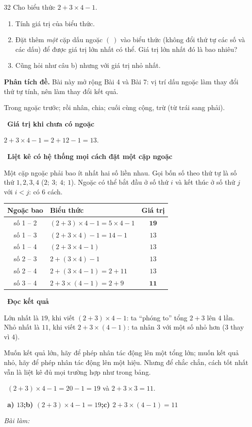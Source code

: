 \documentclass[11pt]{article}
\newif\ifsol \solfalse
\providecommand{\AnsWord}{Đáp số}
\newenvironment{probbox}[2]{\begin{probboxT}{#1}{#2}}{\end{probboxT}}
\newcommand{\StuProb}[2]{\begin{probboxS}{#1}{#2}\StuProbBody\end{probboxS}}
\newcommand{\ans}[1]{\par\smallskip{\bfseries\color{tmGreen!88!black}\AnsWord:}\ {\bfseries\color{AnsRed}#1}\par}
\newcommand{\probsol}[1]{%
  \begin{lrbox}{\solmeasure}\begin{minipage}{\dimexpr\linewidth-24pt\relax}#1\end{minipage}\end{lrbox}%
  \ifsol
    \begin{solbox}#1\end{solbox}%
  \else
    \setlength{\solht}{\dimexpr\ht\solmeasure+\dp\solmeasure+0.85cm\relax}%
    \ifdim\solht<1.35cm\setlength{\solht}{1.35cm}\fi
    \ifdim\solht>\StudentMaxWork\setlength{\solht}{\StudentMaxWork}\fi
    \par\noindent\begin{minipage}{\linewidth}%
    \expandafter\StuProb\StuProbArgs
    \begin{tcolorbox}[colback=white,colframe=Line,boxrule=0.8pt,arc=5pt,
      left=8pt,right=8pt,top=4pt,bottom=4pt,height=\solht]{\footnotesize\color{Slate}\itshape\WorkWord}\end{tcolorbox}%
    \end{minipage}\par\medskip
  \fi}
\newlength{\StudentMaxWork}\setlength{\StudentMaxWork}{4.5cm}
\newcommand{\step}[2]{\par\smallskip\noindent{\bfseries\color{tmBlue!85!black}\StepWord~#1.}\ {\bfseries #2}\par\nopagebreak}
\newcommand{\verify}[1]{\par\smallskip\noindent{\bfseries\color{tmGreen!80!black}\faCheckCircle\ \CheckWord}\ #1\par}
\def\WorkWord{Bài làm:}
\def\AnsWord{Đáp số}
\def\StepWord{Bước}
\def\CheckWord{Thử lại:}
\begin{document}

\begin{probbox}{32}{\relax}
Cho biểu thức $2 + 3 \times 4 - 1$.
\begin{enumerate}[label=\alph*),leftmargin=1.6em,itemsep=0pt,topsep=2pt]
  \item Tính giá trị của biểu thức.
  \item Đặt thêm \emph{một} cặp dấu ngoặc $(\ )$ vào biểu thức (không đổi thứ tự các số và các dấu) để được giá trị
  lớn nhất có thể. Giá trị lớn nhất đó là bao nhiêu?
  \item Cũng hỏi như câu b) nhưng với giá trị nhỏ nhất.
\end{enumerate}
\end{probbox}
\probsol{
\textbf{Phân tích đề.} Bài này mở rộng Bài 4 và Bài 7: vị trí dấu ngoặc làm thay đổi thứ tự tính, nên làm thay đổi kết quả.
\begin{recallbox}Trong ngoặc trước; rồi nhân, chia; cuối cùng cộng, trừ (từ trái sang phải).\end{recallbox}
\step{1}{Giá trị khi chưa có ngoặc}
$2 + 3\times 4 - 1 = 2 + 12 - 1 = 13$.
\step{2}{Liệt kê có hệ thống mọi cách đặt một cặp ngoặc}
Một cặp ngoặc phải bao ít nhất hai số liền nhau. Gọi bốn số theo thứ tự là số thứ $1, 2, 3, 4$ ($2;\ 3;\ 4;\ 1$).
Ngoặc có thể bắt đầu ở số thứ $i$ và kết thúc ở số thứ $j$ với $i < j$: có $6$ cách.
\begin{center}
\begin{tabular}{|c|l|c|}
\hline
\rowcolor{tmBlue!10} Ngoặc bao & Biểu thức & Giá trị\\ \hline
số 1 -- 2 & $(2+3)\times 4 - 1 = 5\times 4 - 1$ & $\mathbf{19}$\\ \hline
số 1 -- 3 & $(2+3\times 4) - 1 = 14 - 1$ & $13$\\ \hline
số 1 -- 4 & $(2+3\times 4-1)$ & $13$\\ \hline
số 2 -- 3 & $2 + (3\times 4) - 1$ & $13$\\ \hline
số 2 -- 4 & $2 + (3\times 4 - 1) = 2 + 11$ & $13$\\ \hline
số 3 -- 4 & $2 + 3\times(4 - 1) = 2 + 9$ & $\mathbf{11}$\\ \hline
\end{tabular}
\end{center}
\step{3}{Đọc kết quả}
Lớn nhất là $19$, khi viết $(2+3)\times 4 - 1$: ta ``phóng to'' tổng $2 + 3$ lên $4$ lần.\\
Nhỏ nhất là $11$, khi viết $2 + 3\times(4-1)$: ta nhân $3$ với một số nhỏ hơn ($3$ thay vì $4$).
\begin{tipbox}Muốn kết quả lớn, hãy để phép nhân tác động lên một tổng lớn; muốn kết quả nhỏ, hãy để phép nhân tác động
lên một hiệu. Nhưng để chắc chắn, cách tốt nhất vẫn là liệt kê đủ mọi trường hợp như trong bảng.\end{tipbox}
\verify{$(2+3)\times 4 - 1 = 20 - 1 = 19$ và $2 + 3\times 3 = 11$.}
\ans{a) $13$;\quad b) $(2+3)\times 4 - 1 = 19$;\quad c) $2 + 3\times(4-1) = 11$}
}
\end{document}
